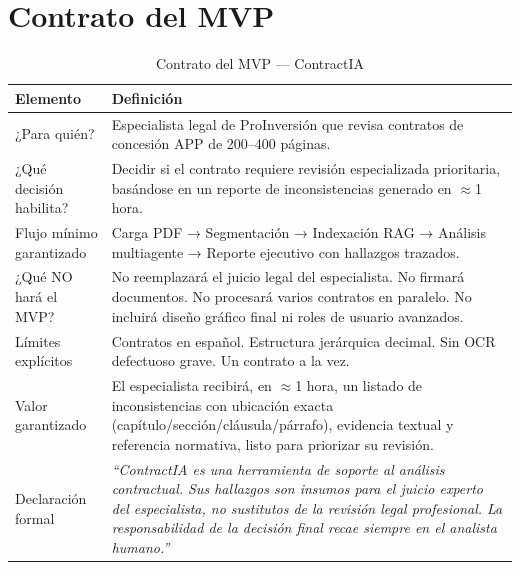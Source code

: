 \section{Contrato del MVP}

\begin{table}[H]
\centering
\caption{Contrato del MVP — ContractIA}
\label{tab:contrato_mvp}
\begin{tabular}{p{4cm} p{10cm}}
\toprule
\textbf{Elemento} & \textbf{Definición} \\
\midrule
¿Para quién? &
  Especialista legal de ProInversión que revisa contratos de concesión APP de 200–400 páginas. \\
\addlinespace
¿Qué decisión habilita? &
  Decidir si el contrato requiere revisión especializada prioritaria,
  basándose en un reporte de inconsistencias generado en $\approx$1 hora. \\
\addlinespace
Flujo mínimo garantizado &
  Carga PDF → Segmentación → Indexación RAG → Análisis multiagente →
  Reporte ejecutivo con hallazgos trazados. \\
\addlinespace
¿Qué NO hará el MVP? &
  No reemplazará el juicio legal del especialista. No firmará documentos. No procesará varios
  contratos en paralelo. No incluirá diseño gráfico final ni roles de usuario avanzados. \\
\addlinespace
Límites explícitos &
  Contratos en español. Estructura jerárquica decimal. Sin OCR defectuoso
  grave. Un contrato a la vez. \\
\addlinespace
Valor garantizado &
  El especialista recibirá, en $\approx$1 hora, un listado de inconsistencias
  con ubicación exacta (capítulo/sección/cláusula/párrafo), evidencia
  textual y referencia normativa, listo para priorizar su revisión. \\
\addlinespace
Declaración formal &
  \textit{``ContractIA es una herramienta de soporte al análisis contractual.
  Sus hallazgos son insumos para el juicio experto del especialista,
  no sustitutos de la revisión legal profesional. La responsabilidad
  de la decisión final recae siempre en el analista humano.''} \\
\bottomrule
\end{tabular}
\end{table}